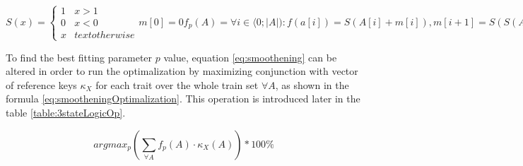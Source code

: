\begin{subequations}
\begin{equation}
S(x) =\begin{cases} 1 & x > 1           \\
                    0 & x < 0           \\
                    x & text{otherwise}
      \end{cases}
\end{equation}
\begin{equation}
m[0] = 0
\end{equation}
\begin{equation}
f_{p}(A) = \forall i \in \langle 0;|A|):  f(a[i]) = S(A[i] + m[i]), m[i+1] = S(S(A[i] + m[i]) + |A[i]|*p)
\end{equation}
\label{eq:smoothening}
\end{subequations}

To find the best fitting parameter $p$ value, equation \ref{eq:smoothening} can be
altered in order to run the optimalization by maximizing conjunction with vector of
reference keys $\kappa_{X}$ for each trait over the whole train set $\forall A$,
as shown in the formula \ref{eq:smootheningOptimalization}.
This operation is introduced later in the table \ref{table:3stateLogicOp}.

\begin{equation}
argmax_{p} (\sum_{\forall A} f_{p}(A)\cdot \kappa_{X}(A) )* 100\%
\label{eq:smootheningOptimalization}
\end{equation}





